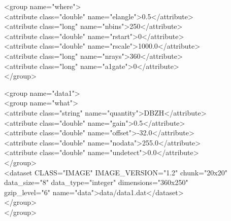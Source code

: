 \documentclass[11p]{article}
\begin{document}
\begin{kod}
        <group name="where">\\
\hspace*{0.5cm}<attribute class="double" name="elangle">0.5</attribute>\\
\hspace*{0.5cm}<attribute class="long" name="nbins">250</attribute>\\
\hspace*{0.5cm}<attribute class="double" name="rstart">0</attribute>\\
\hspace*{0.5cm}<attribute class="double" name="rscale">1000.0</attribute>\\
\hspace*{0.5cm}<attribute class="long" name="nrays">360</attribute>\\
\hspace*{0.5cm}<attribute class="long" name="a1gate">0</attribute>\\
        </group>\\
\end{kod}
\begin{kod}
        <group name="data1">\\
\hspace*{0.5cm}<group name="what">\\
\hspace*{1cm}<attribute class="string" name="quantity">DBZH</attribute>\\
\hspace*{1cm}<attribute class="double" name="gain">0.5</attribute>\\
\hspace*{1cm}<attribute class="double" name="offset">-32.0</attribute>\\
\hspace*{1cm}<attribute class="double" name="nodata">255.0</attribute>\\
\hspace*{1cm}<attribute class="double" name="undetect">0.0</attribute>\\
\hspace*{0.5cm}</group>\\
\hspace*{0.5cm}<dataset CLASS="IMAGE" IMAGE\_VERSION="1.2" chunk="20x20"\\
\hspace*{0.5cm}data\_size="8" data\_type="integer" dimensions="360x250"\\
\hspace*{0.5cm}gzip\_level="6" name="data">data/data1.dat</dataset>\\
\hspace*{0.5cm}</group>\\
    </group>\\
\end{kod}
\end{document}
